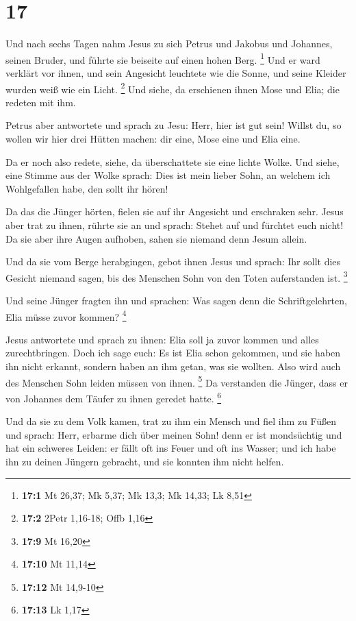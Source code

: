 \hypertarget{section-10}{%
\section{17}\label{section-10}}

 Und nach sechs Tagen nahm Jesus zu sich Petrus und
Jakobus und Johannes, seinen Bruder, und führte sie beiseite auf einen
hohen Berg. \footnote{\textbf{17:1} Mt 26,37; Mk 5,37; Mk 13,3; Mk
  14,33; Lk 8,51}  Und er ward verklärt vor ihnen, und
sein Angesicht leuchtete wie die Sonne, und seine Kleider wurden weiß
wie ein Licht. \footnote{\textbf{17:2} 2Petr 1,16-18; Offb 1,16}
 Und siehe, da erschienen ihnen Mose und Elia; die redeten
mit ihm.

 Petrus aber antwortete und sprach zu Jesu: Herr, hier ist
gut sein! Willst du, so wollen wir hier drei Hütten machen: dir eine,
Mose eine und Elia eine.

 Da er noch also redete, siehe, da überschattete sie eine
lichte Wolke. Und siehe, eine Stimme aus der Wolke sprach: Dies ist mein
lieber Sohn, an welchem ich Wohlgefallen habe, den sollt ihr hören!

 Da das die Jünger hörten, fielen sie auf ihr Angesicht
und erschraken sehr.  Jesus aber trat zu ihnen, rührte sie
an und sprach: Stehet auf und fürchtet euch nicht!  Da sie
aber ihre Augen aufhoben, sahen sie niemand denn Jesum allein.

 Und da sie vom Berge herabgingen, gebot ihnen Jesus und
sprach: Ihr sollt dies Gesicht niemand sagen, bis des Menschen Sohn von
den Toten auferstanden ist. \footnote{\textbf{17:9} Mt 16,20}

 Und seine Jünger fragten ihn und sprachen: Was sagen
denn die Schriftgelehrten, Elia müsse zuvor kommen? \footnote{\textbf{17:10}
  Mt 11,14}

 Jesus antwortete und sprach zu ihnen: Elia soll ja zuvor
kommen und alles zurechtbringen.  Doch ich sage euch: Es
ist Elia schon gekommen, und sie haben ihn nicht erkannt, sondern haben
an ihm getan, was sie wollten. Also wird auch des Menschen Sohn leiden
müssen von ihnen. \footnote{\textbf{17:12} Mt 14,9-10} 
Da verstanden die Jünger, dass er von Johannes dem Täufer zu ihnen
geredet hatte. \footnote{\textbf{17:13} Lk 1,17}

 Und da sie zu dem Volk kamen, trat zu ihm ein Mensch und
fiel ihm zu Füßen  und sprach: Herr, erbarme dich über
meinen Sohn! denn er ist mondsüchtig und hat ein schweres Leiden: er
fällt oft ins Feuer und oft ins Wasser;  und ich habe ihn
zu deinen Jüngern gebracht, und sie konnten ihm nicht helfen.

